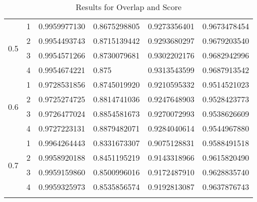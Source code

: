 \begin{longtable}{l|l|l|l|l|l}
 \hline
\multirow{4}{*}{0.5}& 1 & 0.9959977130 & 0.8675298805 & 0.9273356401 & 0.9673478454 \\ \hhline{~-----}
& 2 & 0.9954493743 & 0.8715139442 & 0.9293680297 & 0.9679203540 \\ \hhline{~-----}
& 3 & 0.9954571266 & 0.8730079681 & 0.9302202176 & 0.9682942996 \\ \hhline{~-----}
& 4 & 0.9954674221 & 0.875        & 0.9313543599 & 0.9687913542 \\ \hline
 \hline
\multirow{4}{*}{0.6}& 1 & 0.9728531856 & 0.8745019920 & 0.9210595332 & 0.9514521023 \\ \hhline{~-----}
& 2 & 0.9725274725 & 0.8814741036 & 0.9247648903 & 0.9528423773 \\ \hhline{~-----}
& 3 & 0.9726477024 & 0.8854581673 & 0.9270072993 & 0.9538626609 \\ \hhline{~-----}
& 4 & 0.9727223131 & 0.8879482071 & 0.9284040614 & 0.9544967880 \\ \hline
 \hline
\multirow{4}{*}{0.7}& 1 & 0.9964264443 & 0.8331673307 & 0.9075128831 & 0.9588491518 \\ \hhline{~-----}
& 2 & 0.9958920188 & 0.8451195219 & 0.9143318966 & 0.9615820490 \\ \hhline{~-----}
& 3 & 0.9959159860 & 0.8500996016 & 0.9172487910 & 0.9628835740 \\ \hhline{~-----}
& 4 & 0.9959325973 & 0.8535856574 & 0.9192813087 & 0.9637876743 \\ \hline

\caption{Results for Overlap and Score}
\label{tab_overlapScore}
\end{longtable}





